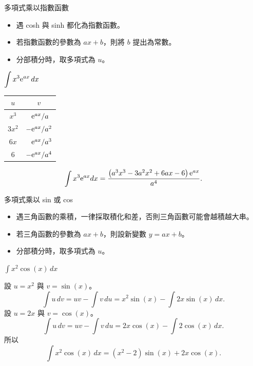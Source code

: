 \documentclass{beamer}
\newcommand{\e}{\textup e}
\theoremstyle{remark}
\begin{document}
\begin{CJK}{UTF8}{bsmi}
\begin{frame}{多項式乘以指數函數}
  \begin{itemize}
    \item 遇 cosh 與 sinh 都化為指數函數。
    \item 若指數函數的參數為 $ax+b$，則將 $b$ 提出為常數。
    \item 分部積分時，取多項式為 $u$。
  \end{itemize}
\end{frame}

\begin{frame}{$\displaystyle \int x^3 \e^{ax}\,dx$}
  \begin{solution}
    \begin{center}
      \begin{tabular}{cc}
	$u$  & $v$\\
	\hline
	$x^3$ & $\phantom+\e^{ax}/a^{\phantom1}$\\
	$3x^2$& $        -\e^{ax}/a^2$\\
	$6x$  & $\phantom+\e^{ax}/a^3$\\
	6     & $        -\e^{ax}/a^4$
      \end{tabular}
    \end{center}
    \[\int x^3 \e^{ax} dx = \frac{\left( a^3 x^3 - 3a^2 x^2 + 6ax - 6 \right) \e^{ax}}{a^4}.\]
  \end{solution}
\end{frame}

\begin{frame}{多項式乘以 sin 或 cos}
  \begin{itemize}
    \item 遇三角函數的乘積，一律採取積化和差，否則三角函數可能會越積越大串。
    \item 若三角函數的參數為 $ax+b$，則設新變數 $y = ax+b$。
    \item 分部積分時，取多項式為 $u$。
  \end{itemize}
\end{frame}

\begin{frame}{$\displaystyle \int x^2 \cos(x)\,dx$}
  \begin{solution}
    設 $u = x^2$ 與 $v = \sin(x)$。
    \[\int u\,dv = uv - \int v\,du = x^2 \sin(x) - \int 2x \sin(x)\,dx.\]
    設 $u = 2x$ 與 $v = \cos(x)$。
    \[\int u\,dv = uv - \int v\,du = 2x \cos(x) - \int 2\cos(x)\,dx.\]
    所以
    \[\int x^2 \cos(x)\,dx = \left( x^2 - 2 \right) \sin(x) + 2x \cos(x).\]
  \end{solution}
\end{frame}


\end{CJK}
\end{document}

